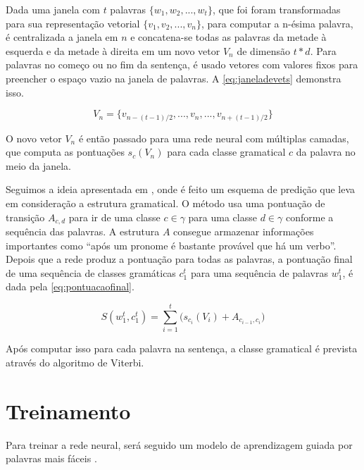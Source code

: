 Dada uma janela com $t$ palavras $\{w_1, w_2, ..., w_t\}$, que foi foram transformadas para sua representação vetorial $\{v_1, v_2, ..., v_n\}$, para computar a n-ésima palavra, é centralizada a janela em $n$ e concatena-se todas as palavras da metade à esquerda e da metade à direita em um novo vetor $V_n$ de dimensão $t * d$. Para palavras no começo ou no fim da sentença, é usado vetores com valores fixos para preencher o espaço vazio na janela de palavras. A \autoref{eq:janeladevets} demonstra isso.

\begin{equation} \label{eq:janeladevets}
V_n = \big\{ v_{n - (t-1)/2}, ..., v_n, ..., v_{{n + (t-1)/2}} \big\}
\end{equation}

O novo vetor $V_n$ é então passado para uma rede neural com múltiplas camadas, que computa as pontuações $s_c(V_n)$ para cada classe gramatical $c$ da palavra no meio da janela. 

Seguimos a ideia apresentada em \cite{collobert2011natural}, onde é feito um esquema de predição que leva em consideração a estrutura gramatical. O método usa uma pontuação de transição $A_{c,d}$ para ir de uma classe $c \in \gamma$ para uma classe $d \in \gamma$ conforme a sequência das palavras. A estrutura $A$ consegue armazenar informações importantes como ``após um pronome é bastante provável que há um verbo''. Depois que a rede produz a pontuação para todas as palavras, a pontuação final de uma sequência de classes gramáticas $c_1^t$ para uma sequência de palavras $w_1^t$, é dada pela \autoref{eq:pontuacaofinal}. 

\begin{equation} \label{eq:pontuacaofinal}
S(w_1^t, c_1^t) = \sum\limits_{i=1}^{t} \Big(s_{c_i}(V_i) + A_{c_{i-1}, c_{i}} \Big)
\end{equation}

Após computar isso para cada palavra na sentença, a classe gramatical é prevista através do algoritmo de Viterbi.


\section{Treinamento}

Para treinar a rede neural, será seguido um modelo de aprendizagem guiada por palavras mais fáceis \cite{shen2007guided}.

